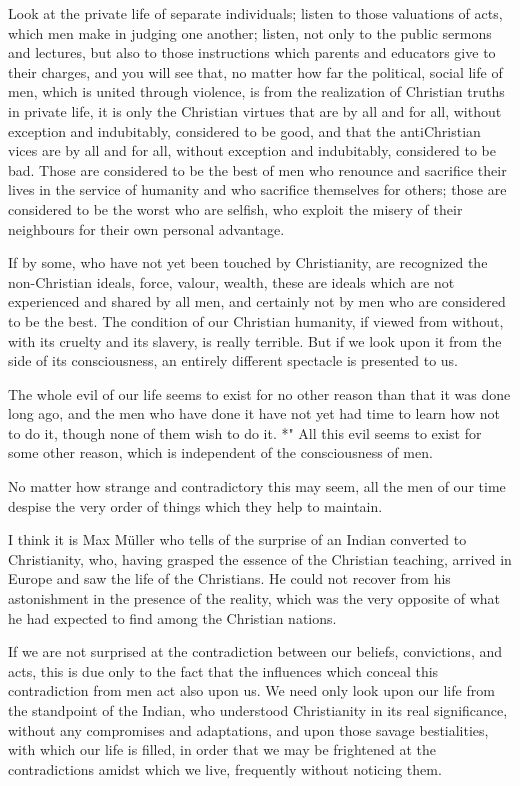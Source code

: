 \documentclass{book}
\begin{document}
Look at the private life of separate individuals; listen to those valuations of acts, which men make in judging one another; listen, not only to the public sermons and lectures, but also to those instructions which parents and educators give to their charges, and you will see that, no matter how far the political, social life of men, which is united through violence, is from the realization of Christian truths in private life, it is only the Christian virtues that are by all and for all, without exception and indubitably, considered to be good, and that the antiChristian vices are by all and for all, without exception and indubitably, considered to be bad. Those are considered to be the best of men who renounce and sacrifice their lives in the service of humanity and who sacrifice themselves for others; those are considered to be the worst who are selfish, who exploit the misery of their neighbours for their own personal advantage.

If by some, who have not yet been touched by Christianity, are recognized the non-Christian ideals, force, valour, wealth, these are ideals which are not experienced and shared by all men, and certainly not by men who are considered to be the best. The condition of our Christian humanity, if viewed from without, with its cruelty and its slavery, is really terrible. But if we look upon it from the side of its consciousness, an entirely different spectacle is presented to us.

The whole evil of our life seems to exist for no other reason than that it was done long ago, and the men who have done it have not yet had time to learn how not to do it, though none of them wish to do it. *" All this evil seems to exist for some other reason, which is independent of the consciousness of men.

No matter how strange and contradictory this may seem, all the men of our time despise the very order of things which they help to maintain.

I think it is Max Müller who tells of the surprise of an Indian converted to Christianity, who, having grasped the essence of the Christian teaching, arrived in Europe and saw the life of the Christians. He could not recover from his astonishment in the presence of the reality, which was the very opposite of what he had expected to find among the Christian nations.

If we are not surprised at the contradiction between our beliefs, convictions, and acts, this is due only to the fact that the influences which conceal this contradiction from men act also upon us. We need only look upon our life from the standpoint of the Indian, who understood Christianity in its real significance, without any compromises and adaptations, and upon those savage bestialities, with which our life is filled, in order that we may be frightened at the contradictions amidst which we live, frequently without noticing them.
\end{document}
